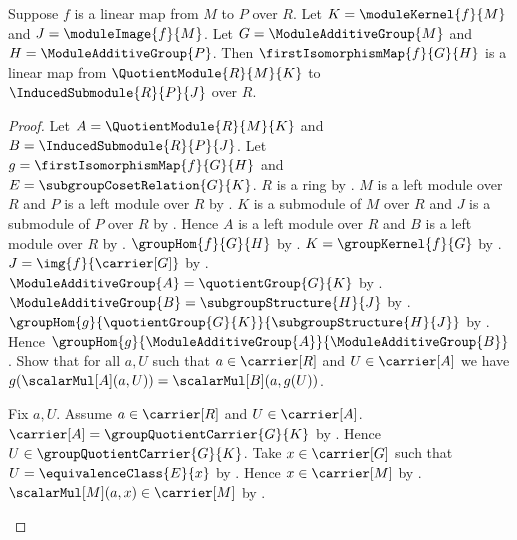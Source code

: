 \begin{theorem}\label{module_first_isomorphism_map_linear}
    Suppose $f$ is a linear map from $M$ to $P$ over $R$.
    Let $K=\moduleKernel{f}{M}$ and
        $J=\moduleImage{f}{M}$.
    Let $G=\ModuleAdditiveGroup{M}$ and
        $H=\ModuleAdditiveGroup{P}$.
    Then $\firstIsomorphismMap{f}{G}{H}$ is a linear map from
        $\QuotientModule{R}{M}{K}$ to
        $\InducedSubmodule{R}{P}{J}$ over $R$.
\end{theorem}
\begin{proof}
    Let $A=\QuotientModule{R}{M}{K}$ and
        $B=\InducedSubmodule{R}{P}{J}$.
    Let $g=\firstIsomorphismMap{f}{G}{H}$ and
        $E=\subgroupCosetRelation{G}{K}$.
    $R$ is a ring by .
    $M$ is a left module over $R$ and
        $P$ is a left module over $R$ by
        .
    $K$ is a submodule of $M$ over $R$ and
        $J$ is a submodule of $P$ over $R$ by
        .
    Hence $A$ is a left module over $R$ and
        $B$ is a left module over $R$ by
        .
    $\groupHom{f}{G}{H}$ by
        .
    $K=\groupKernel{f}{G}$ by .
    $J=\img{f}{\carrier[G]}$ by
        .
    $\ModuleAdditiveGroup{A}=\quotientGroup{G}{K}$ by
        .
    $\ModuleAdditiveGroup{B}=\subgroupStructure{H}{J}$ by
        .
    $\groupHom{g}{\quotientGroup{G}{K}}{
        \subgroupStructure{H}{J}}$ by
        .
    Hence $\groupHom{g}{\ModuleAdditiveGroup{A}}{
        \ModuleAdditiveGroup{B}}$.
    Show that for all $a,U$ such that $a\in\carrier[R]$ and
        $U\in\carrier[A]$ we have
        $g(\scalarMul[A](a,U))=\scalarMul[B](a,g(U))$.
    \begin{subproof}
        Fix $a,U$.
        Assume $a\in\carrier[R]$ and $U\in\carrier[A]$.
        $\carrier[A]=\groupQuotientCarrier{G}{K}$ by
            .
        Hence $U\in\groupQuotientCarrier{G}{K}$.
        Take $x\in\carrier[G]$ such that
            $U=\equivalenceClass{E}{x}$ by
            .
        Hence $x\in\carrier[M]$ by
            .
        $\scalarMul[M](a,x)\in\carrier[M]$ by
            .

\end{subproof}
\end{proof}
